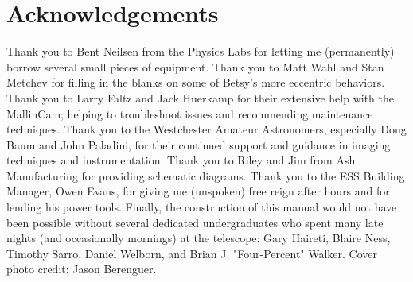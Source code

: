 \documentclass[12pt,titlepage]{article}
\begin{document}
\section*{Acknowledgements}
\thispagestyle{empty}

Thank you to Bent Neilsen from the Physics Labs for letting me (permanently) borrow several small pieces of equipment.
Thank you to Matt Wahl and Stan Metchev for filling in the blanks on some of Betsy's more eccentric behaviors.
Thank you to Larry Faltz and Jack Huerkamp for their extensive help with the MallinCam; helping to troubleshoot issues and recommending maintenance techniques.
Thank you to the Westchester Amateur Astronomers, especially Doug Baum and John Paladini, for their continued support and guidance in imaging techniques and instrumentation.
Thank you to Riley and Jim from Ash Manufacturing for providing schematic diagrams.
Thank you to the ESS Building Manager, Owen Evans, for giving me (unspoken) free reign after hours and for lending his power tools.
Finally, the construction of this manual would not have been possible without several dedicated
undergraduates who spent many late nights (and occasionally mornings) at the
telescope: Gary Haireti, Blaire Ness, Timothy Sarro, Daniel Welborn, and
Brian J. "Four-Percent" Walker.
Cover photo credit: Jason Berenguer.		

\clearpage





\end{document}
